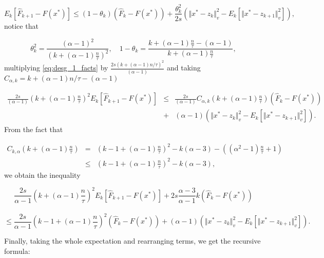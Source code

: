 \documentclass{article}
\newcommand{\x}{x^*}
\begin{document}
\begin{equation}
\label{eq:desg_1_facts}
	E_k\left[\hat{F}_{k+1}-F(\x)\right] \leq (1-\theta_k)\left(\hat{F}_k-F(\x)\right) + \frac{\theta_k^2}{2s}\left(\Vert \x - z_k\Vert_v^2 - E_k\left[\Vert \x - z_{k+1}\Vert^2_v\right]\right),
\end{equation}
notice that

\begin{equation*}
	\theta_k^2 = \frac{(\alpha-1)^2}{\left(k+(\alpha-1)\frac{n}{\tau}\right)^2}, \quad 1-\theta_k = \frac{k+(\alpha-1)\frac{n}{\tau}-(\alpha-1)}{k+(\alpha-1)\frac{n}{\tau}},
\end{equation*}
multiplying \eqref{eq:desg_1_facts} by $\frac{2s(k+(\alpha-1)n/\tau)^2}{(\alpha-1)}$ and taking $C_{\alpha
,k} = k + (\alpha-1)n/\tau - (\alpha-1)$ 

\begin{eqnarray*}
	\frac{2s}{(\alpha-1)}\left(k+(\alpha-1)\frac{n}{\tau}\right)^2E_k\left[\hat{F}_{k+1}-F(\x)\right] &\leq& \frac{2s}{(\alpha-1)}C_{\alpha,k}\left(k+(\alpha-1)\frac{n}{\tau}\right)\left(\hat{F}_k-F(\x)\right) \\
	&+& (\alpha-1) \left(  \Vert \x - z_k \Vert_v^2 - E_k\left[\Vert \x-z_{k+1}\Vert_v^2\right]\right). 
\end{eqnarray*}
From the fact that

\begin{eqnarray*}
C_{k,\alpha}\left(k+(\alpha-1)\frac{n}{\tau} \right) &=& \left(k-1+(\alpha-1)\frac{n}{\tau}\right)^2 -k(\alpha-3) - \left( (\alpha^2-1)\frac{n}{\tau} +1\right) \\
&\leq & \left(k-1+(\alpha-1)\frac{n}{\tau}\right)^2 -k(\alpha-3),
\end{eqnarray*}
we obtain the inequality

\begin{center}
	\begin{equation*}
		\frac{2s}{\alpha-1} \left(k+(\alpha-1)\frac{n}{\tau}\right)^2 E_k \left[\hat{F}_{k+1}-F(\x)\right] + 2s\frac{\alpha-3}{\alpha-1}k\left(\hat{F}_k - F(\x) \right)
	\end{equation*} \\
	\begin{equation}
	\label{eq:start_order}
 		\leq \frac{2s}{\alpha-1}\left(k-1+(\alpha-1)\frac{n}{\tau}\right)^2 \left(\hat{F}_k - F(\x) \right) + (\alpha-1) \left(  \Vert \x - z_k \Vert_v^2 - E_k\left[\Vert \x-z_{k+1}\Vert_v^2\right]\right).
	\end{equation}
\end{center}
Finally, taking the whole expectation and rearranging terms, we get the recursive formula: 
\end{document}
